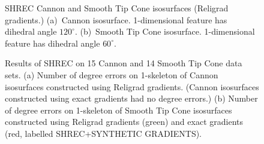 \begin{figure}[t]
\caption{SHREC Cannon and Smooth Tip Cone isosurfaces (Religrad gradients.) 
(a)~Cannon isosurface.
\mbox{1-dimensional} feature has dihedral angle $120^\circ$.
(b)~Smooth Tip Cone isosurface.  1-dimensional feature has dihedral angle $60^\circ$.}
\label{fig:cannon_cone}
\end{figure}

\begin{figure}[t]

\caption{Results of SHREC on 15 Cannon and 14 Smooth Tip Cone data sets.
(a) Number of degree errors on 1-skeleton of Cannon isosurfaces
constructed using Religrad gradients.
(Cannon isosurfaces constructed using exact gradients had no degree errors.)
(b) Number of degree errors on 1-skeleton of Smooth Tip Cone isosurfaces
constructed using Religrad gradients (green) and exact gradients 
(red, labelled SHREC+SYNTHETIC GRADIENTS).}
\label{fig:cannon_cone_summary}
\end{figure}

